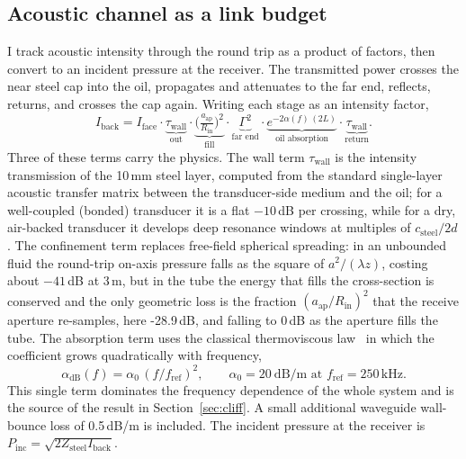 \documentclass{article}
\newcommand{\fillDB}{-28.9}
\begin{document}
\subsection{Acoustic channel as a link budget}
I track acoustic intensity through the round trip as a product of factors, then convert to
an incident pressure at the receiver. The transmitted power crosses the near steel cap into
the oil, propagates and attenuates to the far end, reflects, returns, and crosses the cap
again. Writing each stage as an intensity factor,
\begin{equation}
I_{\mathrm{back}} = I_{\mathrm{face}}\cdot
\underbrace{\tau_{\mathrm{wall}}}_{\text{out}}\cdot
\underbrace{\Big(\tfrac{a_{\mathrm{ap}}}{R_{\mathrm{in}}}\Big)^2}_{\text{fill}}\cdot
\underbrace{\Gamma^2}_{\text{far end}}\cdot
\underbrace{e^{-2\alpha(f)\,(2L)}}_{\text{oil absorption}}\cdot
\underbrace{\tau_{\mathrm{wall}}}_{\text{return}} .
\label{eq:linkbudget}
\end{equation}
Three of these terms carry the physics. The wall term $\tau_{\mathrm{wall}}$ is the intensity
transmission of the 10\,mm steel layer, computed from the standard single-layer acoustic
transfer matrix between the transducer-side medium and the oil; for a well-coupled (bonded)
transducer it is a flat $-10$\,dB per crossing, while for a dry, air-backed transducer it
develops deep resonance windows at multiples of $c_{\mathrm{steel}}/2d$. The confinement term
replaces free-field spherical spreading: in an unbounded fluid the round-trip on-axis pressure
falls as the square of $a^2/(\lambda z)$, costing about $-41$\,dB at 3\,m, but in the tube the
energy that fills the cross-section is conserved and the only geometric loss is the fraction
$(a_{\mathrm{ap}}/R_{\mathrm{in}})^2$ that the receive aperture re-samples, here \fillDB\,dB,
and falling to 0\,dB as the aperture fills the tube. The absorption term uses the classical
thermoviscous law~\citep{kinsler2000} in which the coefficient grows quadratically with frequency,
\begin{equation}
\alpha_{\mathrm{dB}}(f) = \alpha_0\,(f/f_{\mathrm{ref}})^2,\qquad
\alpha_0 = 20\ \text{dB/m at } f_{\mathrm{ref}}=250\,\text{kHz}.
\label{eq:absorption}
\end{equation}
This single term dominates the frequency dependence of the whole system and is the source of
the result in Section~\ref{sec:cliff}. A small additional waveguide wall-bounce loss of
0.5\,dB/m is included. The incident pressure at the receiver is
$P_{\mathrm{inc}}=\sqrt{2 Z_{\mathrm{steel}} I_{\mathrm{back}}}$.
\end{document}
